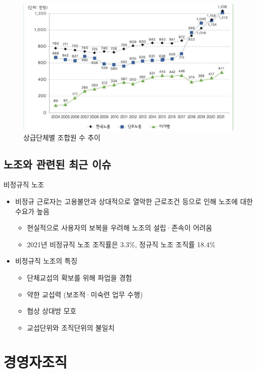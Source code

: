 \documentclass[aspectratio=169,xcolor=dvipsnames,handout]{beamer}
\begin{document}
\begin{frame}
\centering
\begin{figure}
    \includegraphics[width=.7\textwidth]{pic/상급단체별조합원수추이.png}
    \caption{상급단체별 조합원 수 추이}
\end{figure}
\end{frame}

\subsection{노조와 관련된 최근 이슈}

\begin{frame}{비정규직 노조}
    \begin{itemize}[<+->]
        \item 비정규 근로자는 고용불안과 상대적으로 열악한 근로조건 등으로 인해 노조에 대한 수요가 높음
        \begin{itemize}[<+->]
            \item 현실적으로 사용자의 보복을 우려해 노조의 설립·존속이 어려움
            \item 2021년 비정규직 노조 조직률은 3.3\%, 정규직 노조 조직률 18.4\%
        \end{itemize}
        \item 비정규직 노조의 특징  
        \begin{itemize}[<+->]
            \item 단체교섭의 확보를 위해 파업을 경험
            \item 약한 교섭력 (보조적·미숙련 업무 수행)
            \item 협상 상대방 모호
            \item 교섭단위와 조직단위의 불일치
        \end{itemize}
    \end{itemize}
\end{frame}

\section{경영자조직}
\end{document}
